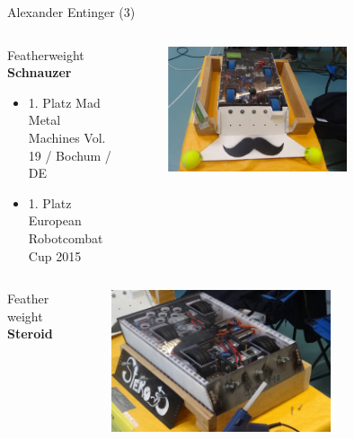 \documentclass{beamer}
\begin{document}
\begin{frame}{Alexander Entinger (3)}
\begin{columns}
 \begin{column}{0.5\textwidth}
  \begin{large}Featherweight \textbf{Schnauzer}\end{large}
  \begin{itemize}
   \item 1. Platz Mad Metal Machines Vol. 19 / Bochum / DE
   \item 1. Platz European Robotcombat Cup 2015
  \end{itemize}
 \end{column}
 \begin{column}{0.5\textwidth}
  \begin{figure}[H]
   \centering
   \includegraphics[width=0.7\textwidth]{./images/robot-schnauzer.jpg}
   \label{fig:robot-schnauzer}
  \end{figure}
 \end{column}
\end{columns}

\begin{columns}
 \begin{column}{0.5\textwidth}
  \begin{large}Featherweight \textbf{Steroid}\end{large}
 \end{column}
 \begin{column}{0.5\textwidth}
  \begin{figure}[H]
   \centering
   \includegraphics[width=0.7\textwidth]{./images/robot-steroid.jpg}
   \label{fig:robot-steroid}
  \end{figure}
 \end{column}
\end{columns}
\end{frame}
\end{document}
